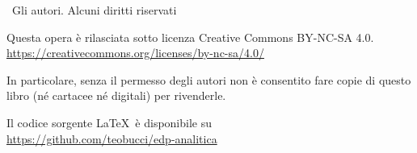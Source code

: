 \textcopyright \ Gli autori. Alcuni diritti riservati

Questa opera è rilasciata sotto licenza Creative Commons BY-NC-SA 4.0.\\
\url{https://creativecommons.org/licenses/by-nc-sa/4.0/}

In particolare, senza il permesso degli autori non è consentito fare copie di questo libro (né cartacee né digitali) per rivenderle.

Il codice sorgente \LaTeX \ è disponibile su \\
\url{https://github.com/teobucci/edp-analitica}